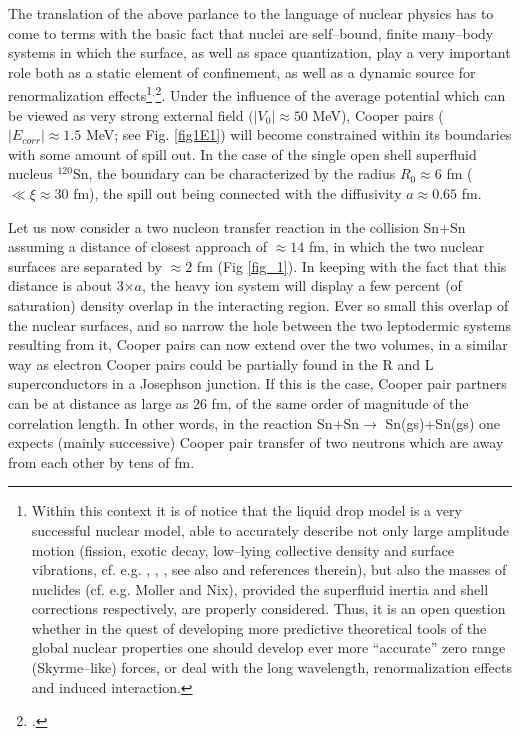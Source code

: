 The translation of the above parlance to the language of nuclear physics has to come to terms with the basic fact that nuclei are self--bound, finite many--body systems in which the surface, as well as space quantization, play a very important role both as a static element of confinement, as well as a dynamic source for renormalization effects\footnote{Within this context it is of notice that the liquid drop model is a very successful nuclear model, able to accurately describe not only large amplitude motion (fission, exotic decay, low--lying collective density and surface vibrations, cf. e.g. \cite{Bohr:39}, \cite{Barranco:90}, \cite{Bertsch:88b}, see also \cite{Brink:05} and references therein), but also the masses of nuclides (cf. e.g. Moller and Nix), provided the superfluid inertia and shell corrections respectively, are properly considered. Thus, it is an open question whether in the quest of developing more predictive theoretical tools of the global nuclear properties one should develop ever more ``accurate'' zero range (Skyrme--like) forces, or deal with the long wavelength, renormalization effects and induced interaction.}$^,$\footnote{\cite{Broglia:02d}.}.
Under the influence of the average potential which can be viewed as very strong external field $(|V_0|\approx 50$ MeV), Cooper pairs ($|E_{corr}|\approx 1.5$ MeV; see Fig. \ref{fig1E1}) will become constrained within its boundaries with some amount of spill out. In the case of the single open shell superfluid nucleus $^{120}$Sn, the boundary can be characterized by the radius $R_0\approx 6$ fm ($\ll \xi\approx 30$ fm), the spill out being connected with the diffusivity $a\approx 0.65$ fm. 


Let us now consider a two nucleon transfer reaction in the collision Sn+Sn assuming a distance of closest approach of $\approx 14$ fm, in which the two nuclear surfaces are separated by $\approx 2$ fm (Fig \ref{fig_1}). In keeping with the fact that this distance is about 3$\times a$, the heavy ion system will display a few percent (of saturation) density overlap in the interacting region. Ever so small this overlap of the nuclear surfaces, and so narrow the hole between the two leptodermic systems resulting from  it,  Cooper pairs can now extend over the two volumes, in a similar way as electron Cooper pairs could be partially found in the R and L superconductors in a Josephson junction. If this is the case, Cooper pair partners can be at distance as large as 26 fm, of the same order of magnitude of the correlation length. In other words, in the reaction Sn+Sn$\rightarrow$ Sn(gs)+Sn(gs) one expects (mainly successive) Cooper pair transfer of two neutrons which are away from each other by tens of fm.


